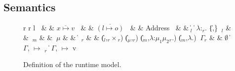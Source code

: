 \subsection{Semantics}
\begin{figure}[!ht]
\small
\centering
\begin{grammar}%
\begin{tabular}{r r l}
$~$ & \: & $\overline{x \mapsto v}$
$~$ & \: & $\overline{(l \mapsto o)}$
$~$ & \: & Address
$~$ & \: &  \| $_l$ \| $\lambda$:$_r$. \| \{,\}
$~$$_l$ & \: & 
$~$$_m$ & \: & 
$~\mu$ & \: &  \| 
$~$$_r$ & \: &  \| ($_{l}$,$_r\times$$_r$) \| ($_\mu$,$_r$) \|($_m$,$\lambda$:$\mu_1\mu_2$$_r$.) \| ($_m$,$\lambda$.) 
$~\Gamma_r$ & \: & $\emptyset$ \| $\Gamma$,  $\mapsto$ $_r$ \| $\Gamma$, $\mapsto$ v
\end{tabular} %
\end{grammar}
\caption{Definition of the runtime model.}
\label{fig:runtime}
\end{figure}


